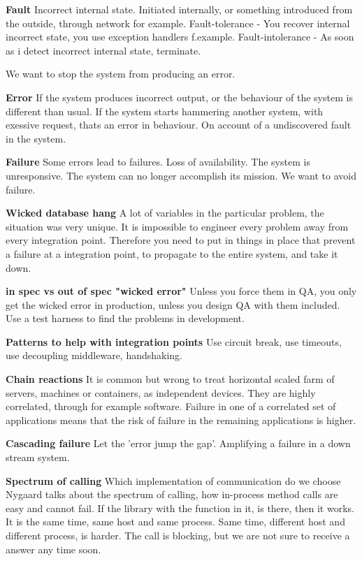 \textbf{Fault}
Incorrect internal state. Initiated internally, or something introduced from the outside, through network for example.
Fault-tolerance - You recover internal incorrect state, you use exception handlers f.example.
Fault-intolerance - As soon as i detect incorrect internal state, terminate.

We want to stop the system from producing an error.

\textbf{Error}
If the system produces incorrect output, or the behaviour of the system is different than usual. If the system starts hammering another system, with exessive request, thats an error in behaviour.
On account of a undiscovered fault in the system.

\textbf{Failure}
Some errors lead to failures.
Loss of availability. The system is unresponsive. The system can no longer accomplish its mission.
We want to avoid failure.

\textbf{Wicked database hang}
A lot of variables in the particular problem, the situation was very unique. 
It is impossible to engineer every problem away from every integration point. Therefore you need to put in things in place that prevent a failure at a integration point, to propagate to the entire system, and take it down.

\textbf{in spec vs out of spec "wicked error"}
Unless you force them in QA, you only get the wicked error in production, unless you design QA with them included.
Use a test harness to find the problems in development.

\textbf{Patterns to help with integration points}
Use circuit break, use timeouts, use decoupling middleware, handshaking.

\textbf{Chain reactions}
It is common but wrong to treat horizontal scaled farm of servers, machines or containers, as independent devices. They are highly correlated, through for example software.
Failure in one of a correlated set of applications means that the risk of failure in the remaining applications is higher.

\textbf{Cascading failure}
Let the 'error jump the gap'. Amplifying a failure in a down stream system.


\textbf{Spectrum of calling}
Which implementation of communication do we choose 
Nygaard talks about the spectrum of calling, how in-process method calls are easy and cannot fail. If the library with the function in it, is there, then it works. It is the same time, same host and same process.
Same time, different host and different process, is harder. The call is blocking, but we are not sure to receive a answer any time soon.

